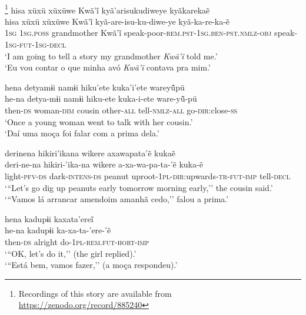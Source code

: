 \documentclass[output=paper,
modfonts,nonflat
]{langsci/langscibook}
\begin{document}
\\
\footnote{Recordings of this story are available from \url{https://zenodo.org/record/885240}}
\ea   hisa xüxü xüxüwe Kwã'ĩ kyã'arisukudiweye kyãkarekaẽ \\[.3em]
\gll hisa xüxü xüxüwe Kwã'ĩ kyã-are-isu-ku-diwe-ye kyã-ka-re-ka-ẽ\\      1\textsc{sg}  \textsc{1sg.poss} grandmother Kwã'ĩ speak-poor-\textsc{rem.pst-1sg.ben-pst.nmlz-obj} speak-\textsc{1sg-fut-1sg-decl} \\

\glt `I am going to tell a story my grandmother \textit{Kwã'ĩ} told me.' \\
`Eu vou contar o que minha avó \textit{Kwã'ĩ} contava pra mim.'\\
\z

\newpage
\ea   hena detyamɨi namɨi hiku'ete kuka'i'ete wareyü̃pü \\[.3em]
\gll he-na detya-mɨi namɨi hiku-ete kuka-i-ete ware-yü̃-pü\\
then-\textsc{ds} woman-\textsc{dim} cousin other-\textsc{all} tell-\textsc{nmlz-all} go-\textsc{dir:}close-\textsc{ss}\\
\glt    `Once a young woman went to talk with her cousin.' \\
`Daí uma moça foi falar com a prima dela.'
\z

\ea   derinena hikiri'ikana wikere axawapata'ẽ kukaẽ \\[.3em]
\gll deri-ne-na hikiri-'ika-na wikere a-xa-wa-pa-ta-'ẽ kuka-ẽ \\ 
light-\textsc{pfv-ds} dark-\textsc{intens-ds} peanut uproot-\textsc{1pl}-\textsc{dir:}upwards-\textsc{tr}-\textsc{fut}-\textsc{imp} tell-\textsc{decl} \\
\glt   `{``}Let's go dig up peanuts early tomorrow morning early,'' the cousin said.' \\
`{``}Vamos lá arrancar amendoim amanhã cedo,'' falou a prima.'
\z

\ea  hena kadupɨi kaxata'ereĩ \\[.3em]
\gll he-na kadupɨi ka-xa-ta-'ere-'ẽ\\
then-\textsc{ds} alright do-\textsc{1pl-rem.fut-hort-imp}\\
\glt   `{``}OK, let's do it,'' (the girl replied).' \\
`{``}Está bem, vamos fazer,'' (a moça respondeu).'\\
\z
\end{document}
